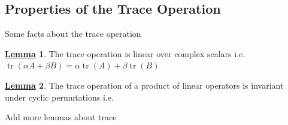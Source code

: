 \documentclass[11pt, answers]{exam}
\theoremstyle{definition}
\theoremstyle{bulleted}
\newtheorem{bulletlemma}{\underline{Lemma}}[section]
\begin{document}
		\subsection{Properties of the Trace Operation}
		\noindent Some facts about the trace operation
		\begin{bulletlemma}
			The trace operation is linear over complex scalars i.e. $\operatorname{tr}(\alpha A+\beta B) =\alpha\operatorname{tr}(A)+\beta\operatorname{tr}(B)$
		\end{bulletlemma}
		\begin{bulletlemma}
			The trace operation of a product of linear operators is invariant under cyclic permutations i.e.
		\end{bulletlemma}
		\begin{todo}
			Add more lemmas about trace
		\end{todo}
		
\end{document}
